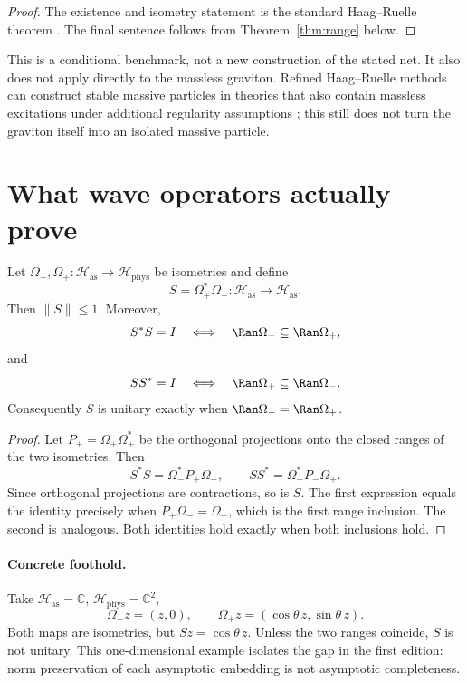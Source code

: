 \documentclass[11pt]{article}
\newcommand{\Has}{\mathcal H_{\mathrm{as}}}
\newcommand{\Hphys}{\mathcal H_{\mathrm{phys}}}
\newcommand{\OmIn}{\Omega_{-}}
\newcommand{\OmOut}{\Omega_{+}}
\begin{document}
\begin{proof}
The existence and isometry statement is the standard Haag--Ruelle theorem
\cite{Ruelle1962,Haag1996}. The final sentence follows from
Theorem~\ref{thm:range} below.
\end{proof}

This is a conditional benchmark, not a new construction of the stated net.
It also does not apply directly to the massless graviton. Refined
Haag--Ruelle methods can construct stable massive particles in theories that
also contain massless excitations under additional regularity assumptions
\cite{Dybalski2005}; this still does not turn the graviton itself into an
isolated massive particle.

\section{What wave operators actually prove}

\begin{theorem}
\label{thm:range}
Let $\OmIn,\OmOut:\Has\to\Hphys$ be isometries and define
\[
 S=\OmOut^{*}\OmIn:\Has\to\Has.
\]
Then $\|S\|\leq1$. Moreover,
\[
 S^{*}S=I
 \quad\Longleftrightarrow\quad
 \Ran\OmIn\subseteq\Ran\OmOut,
\]
and
\[
 SS^{*}=I
 \quad\Longleftrightarrow\quad
 \Ran\OmOut\subseteq\Ran\OmIn.
\]
Consequently $S$ is unitary exactly when
$\Ran\OmIn=\Ran\OmOut$.
\end{theorem}

\begin{proof}
Let $P_\pm=\Omega_\pm\Omega_\pm^*$ be the orthogonal projections onto
the closed ranges of the two isometries. Then
\[
 S^*S=\OmIn^*P_+\OmIn,\qquad
 SS^*=\OmOut^*P_-\OmOut.
\]
Since orthogonal projections are contractions, so is $S$. The first
expression equals the identity precisely when $P_+\OmIn=\OmIn$, which is the
first range inclusion. The second is analogous. Both identities hold exactly
when both inclusions hold.
\end{proof}

\paragraph{Concrete foothold.}
Take $\Has=\mathbb C$, $\Hphys=\mathbb C^2$,
\[
 \OmIn z=(z,0),\qquad
 \OmOut z=(\cos\theta\,z,\sin\theta\,z).
\]
Both maps are isometries, but $S z=\cos\theta\,z$. Unless the two ranges
coincide, $S$ is not unitary. This one-dimensional example isolates the gap
in the first edition: norm preservation of each asymptotic embedding is not
asymptotic completeness.
\end{document}

